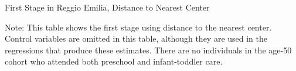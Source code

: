 \begin{table}[H]
\begin{center}
\caption{First Stage in Reggio Emilia, Distance to Nearest Center} \label{tab:dist-center}
\scalebox{0.7}{
}
\end{center}
\raggedright Note: This table shows the first stage using distance to the nearest center. Control variables are omitted in this table, although they are used in the regressions that produce these estimates. There are no individuals in the age-50 cohort who attended both preschool and infant-toddler care.
\end{table}


